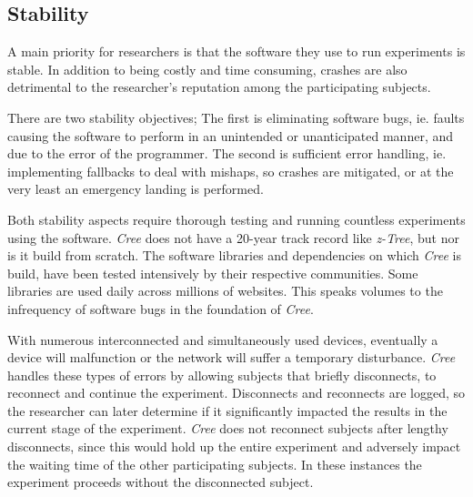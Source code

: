 \documentclass[preprint, 12pt]{elsarticle}
\newcommand{\Cree}{\emph{Cree}\xspace}
\begin{document}
\subsection{Stability}

A main priority for researchers is that the software they use to run experiments is stable. In addition to being costly and time consuming, crashes are also detrimental to the researcher's reputation among the participating subjects. 

There are two stability objectives; The first is eliminating software bugs, ie. faults causing the software to perform in an unintended or unanticipated manner, and due to the error of the programmer. The second is sufficient error handling, ie. implementing fallbacks to deal with mishaps, so crashes are mitigated, or at the very least an emergency landing is performed.

Both stability aspects require thorough testing and running countless experiments using the software. \Cree does not have a 20-year track record like \emph{z-Tree}, but nor is it build from scratch. The software libraries and dependencies on which \Cree is build, have been tested intensively by their respective communities. Some libraries are used daily across millions of websites\footnotemark[6]. This speaks volumes to the infrequency of software bugs in the foundation of \Cree.


With numerous interconnected and simultaneously used devices, eventually a device will malfunction or the network will suffer a temporary disturbance. \Cree handles these types of errors by allowing subjects that briefly disconnects, to reconnect and continue the experiment. Disconnects and reconnects are logged, so the researcher can later determine if it significantly impacted the results in the current stage of the experiment. \Cree does not reconnect subjects after lengthy disconnects, since this would hold up the entire experiment and adversely impact the waiting time of the other participating subjects. In these instances the experiment proceeds without the disconnected subject.
\end{document}
